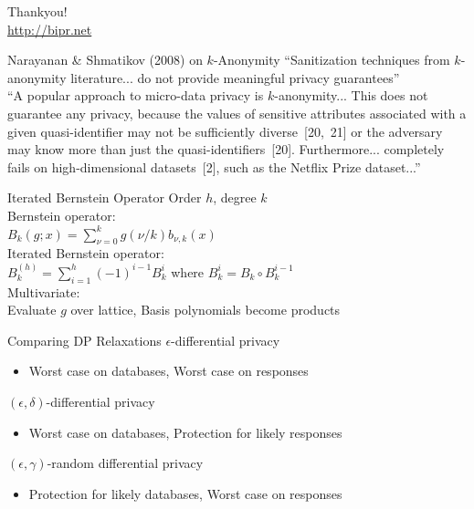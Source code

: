 \documentclass{beamer}
\begin{document}
\begin{frame}[standout]
Thankyou! \\
\url{http://bipr.net}
\end{frame}

\appendix

\begin{frame}{Narayanan \& Shmatikov (2008) on $k$-Anonymity}
``Sanitization techniques from $k$-anonymity literature... do not provide meaningful privacy guarantees''\\[2em]

``A popular approach to micro-data privacy is $k$-anonymity... This does not guarantee any privacy, because the values of sensitive attributes associated with a given quasi-identifier may not be sufficiently diverse~[20,~21] or the adversary may know more than just the quasi-identifiers~[20]. Furthermore... completely fails on high-dimensional datasets~[2], such as the Netflix Prize dataset...''
\end{frame}

\begin{frame}{Iterated Bernstein Operator}
Order $h$, degree $k$ \\[1em]

\alert{Bernstein operator}:\\
$B_k(g; x) = \sum_{\nu=0}^k g(\nu/k) b_{\nu,k}(x)$ \\[1em]

\alert{Iterated Bernstein operator}:\\
$B_k^{(h)} = \sum_{i=1}^h (-1)^{i-1} B_k^i$ where $B_k^i = B_k\circ B_k^{i-1}$ \\[1em]

\alert{Multivariate}:\\
Evaluate $g$ over lattice, Basis polynomials become products
\end{frame}

\begin{frame}{Comparing DP Relaxations}
\alert{$\epsilon$-differential privacy}
\begin{itemize}
	\item Worst case on databases, Worst case on responses
\end{itemize}

\alert{$(\epsilon,\delta)$-differential privacy}
\begin{itemize}
	\item Worst case on databases, Protection for likely responses
\end{itemize}

\alert{$(\epsilon,\gamma)$-random differential privacy}
\begin{itemize}
	\item Protection for likely databases, Worst case on responses
\end{itemize}
\end{frame}
\end{document}
